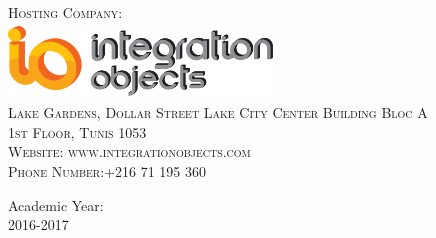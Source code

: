 \begin{titlepage}
\begin{center}
~\\
~\\
~\\
~\\

\textsc{\LARGE Hosting Company: }\\[0.3cm]
\includegraphics[width=7cm,height=2cm]{./iologo}~\\[0.4cm]
\textsc{Lake Gardens, Dollar Street Lake City Center Building Bloc A\\ 1st Floor, Tunis 1053 \\ Website: www.integrationobjects.com \\ Phone Number:+216 71 195 360}\\[1cm]


\vfill

{\large Academic Year:}\\
{\large 2016-2017}

\end{center}
\end{titlepage}